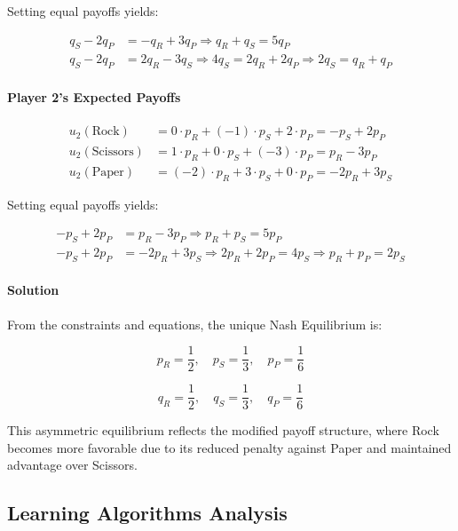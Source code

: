 \documentclass[conference]{IEEEtran}
\begin{document}
Setting equal payoffs yields:

\begin{align}
q_S - 2q_P &= -q_R + 3q_P \Rightarrow q_R + q_S = 5q_P \label{eq:mod1} \\
q_S - 2q_P &= 2q_R - 3q_S \Rightarrow 4q_S = 2q_R + 2q_P \Rightarrow 2q_S = q_R + q_P \label{eq:mod2}
\end{align}

\paragraph{Player 2's Expected Payoffs}

\begin{align}
u_2(\text{Rock}) &= 0 \cdot p_R + (-1) \cdot p_S + 2 \cdot p_P = -p_S + 2p_P \\
u_2(\text{Scissors}) &= 1 \cdot p_R + 0 \cdot p_S + (-3) \cdot p_P = p_R - 3p_P \\
u_2(\text{Paper}) &= (-2) \cdot p_R + 3 \cdot p_S + 0 \cdot p_P = -2p_R + 3p_S
\end{align}

Setting equal payoffs yields:

\begin{align}
-p_S + 2p_P &= p_R - 3p_P \Rightarrow p_R + p_S = 5p_P \label{eq:mod3} \\
-p_S + 2p_P &= -2p_R + 3p_S \Rightarrow 2p_R + 2p_P = 4p_S \Rightarrow p_R + p_P = 2p_S \label{eq:mod4}
\end{align}

\paragraph{Solution}

From the constraints and equations, the unique Nash Equilibrium is:

\begin{equation}
p_R = \frac{1}{2}, \quad p_S = \frac{1}{3}, \quad p_P = \frac{1}{6}
\end{equation}

\begin{equation}
q_R = \frac{1}{2}, \quad q_S = \frac{1}{3}, \quad q_P = \frac{1}{6}
\end{equation}

This asymmetric equilibrium reflects the modified payoff structure, where Rock becomes more favorable due to its reduced penalty against Paper and maintained advantage over Scissors.

\subsection{Learning Algorithms Analysis}
\end{document}
